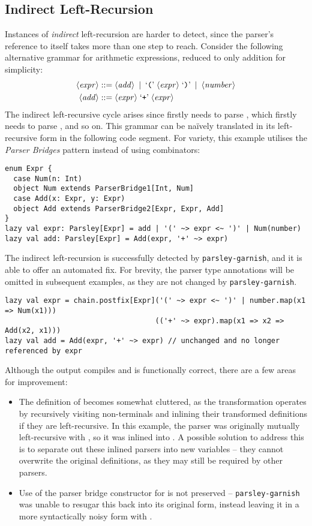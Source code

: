 \documentclass[../../main.tex]{subfiles}
\begin{document}
\subsection{Indirect Left-Recursion}
Instances of \emph{indirect} left-recursion are harder to detect, since the parser's reference to itself takes more than one step to reach.
Consider the following alternative grammar for arithmetic expressions, reduced to only addition for simplicity:
\begin{align*}
\langle \mathit{expr} \rangle &::= \langle \mathit{add} \rangle \enspace | \enspace \text{`\texttt{(}'} \; \langle \mathit{expr} \rangle \; \text{`\texttt{)}'} \enspace | \enspace \langle \mathit{number} \rangle \\
\langle \mathit{add} \rangle &::= \langle \mathit{expr} \rangle \; \text{`\texttt{+}'} \; \langle \mathit{expr} \rangle
\end{align*}
%
The indirect left-recursive cycle arises since  firstly needs to parse , which firstly needs to parse , and so on.
This grammar can be naïvely translated in its left-recursive form in the following code segment.
For variety, this example utilises the \emph{Parser Bridges} pattern instead of using  combinators:
\begin{verbatim}
enum Expr {
  case Num(n: Int)
  object Num extends ParserBridge1[Int, Num]
  case Add(x: Expr, y: Expr)
  object Add extends ParserBridge2[Expr, Expr, Add]
}
lazy val expr: Parsley[Expr] = add | '(' ~> expr <~ ')' | Num(number)
lazy val add: Parsley[Expr] = Add(expr, '+' ~> expr)
\end{verbatim}
%
The indirect left-recursion is successfully detected by \texttt{parsley-garnish}, and it is able to offer an automated fix.
For brevity, the parser type annotations will be omitted in subsequent examples, as they are not changed by \texttt{parsley-garnish}.
\begin{verbatim}
lazy val expr = chain.postfix[Expr]('(' ~> expr <~ ')' | number.map(x1 => Num(x1)))
                                   (('+' ~> expr).map(x1 => x2 => Add(x2, x1)))
lazy val add = Add(expr, '+' ~> expr) // unchanged and no longer referenced by expr
\end{verbatim}
%
Although the output compiles and is functionally correct, there are a few areas for improvement:
\begin{itemize}
  \item The definition of  becomes somewhat cluttered, as the transformation operates by recursively visiting non-terminals and inlining their transformed definitions if they are left-recursive. In this example, the  parser was originally mutually left-recursive with , so it was inlined into . A possible solution to address this is to separate out these inlined parsers into new variables -- they cannot overwrite the original definitions, as they may still be required by other parsers.
  \item Use of the parser bridge constructor for  is not preserved -- \texttt{parsley-garnish} was unable to resugar this back into its original form, instead leaving it in a more syntactically noisy form with .
\end{itemize}
\end{document}
